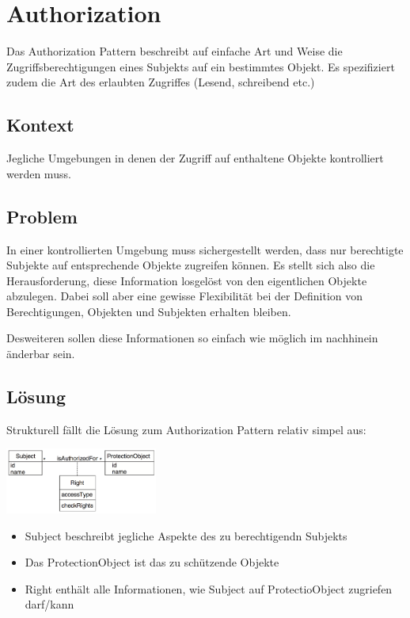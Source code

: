 \section{Authorization}

Das Authorization Pattern beschreibt auf einfache Art und Weise die Zugriffsberechtigungen eines Subjekts auf ein bestimmtes Objekt. Es spezifiziert zudem die Art des erlaubten Zugriffes (Lesend, schreibend etc.)

\subsection*{Kontext}
Jegliche Umgebungen in denen der Zugriff auf enthaltene Objekte kontrolliert werden muss.

\subsection*{Problem}
In einer kontrollierten Umgebung muss sichergestellt werden, dass nur berechtigte Subjekte auf entsprechende Objekte zugreifen können. Es stellt sich also die Herausforderung, diese Information losgelöst von den eigentlichen Objekte abzulegen. Dabei soll aber eine gewisse Flexibilität bei der Definition von Berechtigungen, Objekten und Subjekten erhalten bleiben.

Desweiteren sollen diese Informationen so einfach wie möglich im nachhinein änderbar sein.

\subsection*{Lösung}
Strukturell fällt die Lösung zum Authorization Pattern relativ simpel aus:

\includegraphics[width=50mm]{chapter/01accesscontrolmodels/authorization.png}

\begin{itemize}
	\item Subject beschreibt jegliche Aspekte des zu berechtigendn Subjekts
	\item Das ProtectionObject ist das zu schützende Objekte
	\item Right enthält alle Informationen, wie Subject auf ProtectioObject zugriefen darf/kann
\end{itemize}


